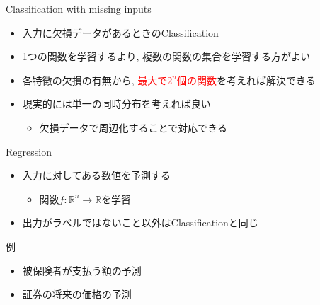 \documentclass[dvipdfmx, 10pt]{beamer}
\newcommand{\red}[1]{\textcolor{red}{#1}}
\newcommand{\green}[1]{\textcolor{green!40!black}{#1}}
\begin{document}

\begin{frame}{Classification with missing inputs}
  \begin{itemize}
    \item 入力に欠損データがあるときのClassification
    \item 1つの関数を学習するより, 複数の関数の集合を学習する方がよい
    \item 各特徴の欠損の有無から, \red{最大で$2 ^ {n}$個の関数}を考えれば解決できる
    \item 現実的には単一の同時分布を考えれば良い
      \begin{itemize}
        \item 欠損データで周辺化することで対応できる
      \end{itemize}
  \end{itemize}
\end{frame}


\begin{frame}{Regression}
  \begin{itemize}
    \item 入力に対してある数値を予測する
    \begin{itemize}
      \item 関数$f: \mathbb{R} ^ {n} \to \mathbb{R}$を学習
    \end{itemize}
    \item 出力がラベルではないこと以外はClassificationと同じ
  \end{itemize}
  \begin{exampleblock}{例}
    \begin{itemize}
      \item 被保険者が支払う額の予測
      \item 証券の将来の価格の予測
    \end{itemize}
  \end{exampleblock}
\end{frame}

\end{document}

